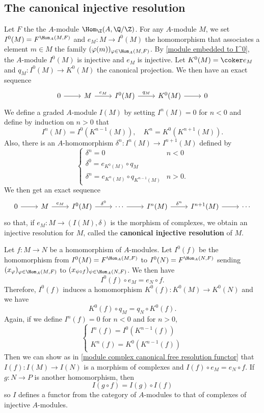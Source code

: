\subsection{The canonical injective resolution}
Let $F$ the the $A$-module $\Hom_{\Z}(A,\Q/\Z)$. For any $A$-module $M$, we set $I^0(M)=F^{\Hom_A(M,F)}$ and $e_M:M\to I^0(M)$ the homomorphism that associates a element $m\in M$ the family $(\varphi(m))_{\varphi\in\Hom_A(M,F)}$. By \cref{module embedded to I^0}, the $A$-module $I^0(M)$ is injective and $e_M$ is injective. Let $K^0(M)=\coker e_M$ and $q_M:I^0(M)\to K^0(M)$ the canonical projection. We then have an exact sequence
\[\begin{tikzcd}
0\ar[r]&M\ar[r,"e_M"]&I^0(M)\ar[r,"q_M"]&K^0(M)\ar[r]&0
\end{tikzcd}\] 
We define a graded $A$-module $I(M)$ by setting $I^n(M)=0$ for $n<0$ and define by induction on $n>0$ that
\[I^n(M)=I^0(K^{n-1}(M)),\quad K^n=K^0(K^{n+1}(M)).\]
Also, there is an $A$-homomorphism $\delta^n:I^n(M)\to I^{n+1}(M)$ defined by
\[\begin{cases}
\delta^n=0&n<0\\
\delta^0=e_{K^0(M)}\circ q_M&\\
\delta^n=e_{K^n(M)}\circ q_{K^{n-1}(M)}&n>0.
\end{cases}\]
We then get an exact sequence
\[\begin{tikzcd}
0\ar[r]&M\ar[r,"e_M"]&I^0(M)\ar[r,"\delta^0"]&\cdots\ar[r]&I^n(M)\ar[r,"\delta^n"]&I^{n+1}(M)\ar[r]&\cdots
\end{tikzcd}\]
so that, if $e_M:M\to(I(M),\delta)$ is the morphism of complexes, we obtain an injective resolution for $M$, called the \textbf{canonical injective resolution} of $M$.\par
Let $f:M\to N$ be a homomorphism of $A$-modules. Let $I^0(f)$ be the homomorphism from $I^0(M)=F^{\Hom_A(M,F)}$ to $I^0(N)=F^{\Hom_A(N,F)}$ sending $(x_\varphi)_{\varphi\in\Hom_A(M,F)}$ to $(x_{\psi\circ f})_{\psi\in\Hom_A(N,F)}$. We then have
\[I^0(f)\circ e_M=e_N\circ f.\]
Therefore, $I^0(f)$ induces a homomorphism $K^0(f):K^0(M)\to K^0(N)$ and we have
\[K^0(f)\circ q_M=q_N\circ K^0(f).\]
Again, if we define $I^n(f)=0$ for $n<0$ and for $n>0$,
\[\begin{cases}
I^n(f)=I^0(K^{n-1}(f))\\
K^n(f)=K^0(K^{n-1}(f))
\end{cases}\]
Then we can show as in \cref{module complex canonical free resolution functor} that $I(f):I(M)\to I(N)$ is a morphism of complexes and $I(f)\circ e_M=e_N\circ f$. If $g:N\to P$ is another homomorphism, then
\[I(g\circ f)=I(g)\circ I(f)\]
so $I$ defines a functor from the category of $A$-modules to that of complexes of injective $A$-modules.
